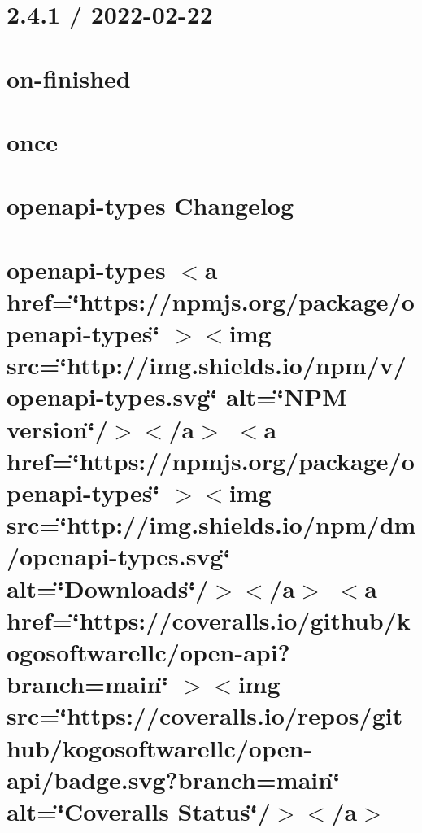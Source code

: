 \documentclass[twoside]{book}
\newcommand{\+}{\discretionary{\mbox{\scriptsize$\hookleftarrow$}}{}{}}
\begin{document}
\chapter{2.4.1 / 2022-\/02-\/22}
\label{md_Backend_nodejs_node_modules_on_finished_HISTORY}

\chapter{on-\/finished}
\label{md_Backend_nodejs_node_modules_on_finished_README}

\chapter{once}
\label{md_Backend_nodejs_node_modules_once_README}

\chapter{openapi-\/types Changelog}
\label{md_Backend_nodejs_node_modules_openapi_types_CHANGELOG}

\chapter{openapi-\/types \texorpdfstring{$<$}{<}a href=\char`\"{}https\+://npmjs.\+org/package/openapi-\/types\char`\"{} \texorpdfstring{$>$}{>}\texorpdfstring{$<$}{<}img src=\char`\"{}http\+://img.\+shields.\+io/npm/v/openapi-\/types.\+svg\char`\"{} alt=\char`\"{}\+NPM version\char`\"{}/\texorpdfstring{$>$}{>}\texorpdfstring{$<$}{<}/a\texorpdfstring{$>$}{>} \texorpdfstring{$<$}{<}a href=\char`\"{}https\+://npmjs.\+org/package/openapi-\/types\char`\"{} \texorpdfstring{$>$}{>}\texorpdfstring{$<$}{<}img src=\char`\"{}http\+://img.\+shields.\+io/npm/dm/openapi-\/types.\+svg\char`\"{} alt=\char`\"{}\+Downloads\char`\"{}/\texorpdfstring{$>$}{>}\texorpdfstring{$<$}{<}/a\texorpdfstring{$>$}{>} \texorpdfstring{$<$}{<}a href=\char`\"{}https\+://coveralls.\+io/github/kogosoftwarellc/open-\/api?branch=main\char`\"{} \texorpdfstring{$>$}{>}\texorpdfstring{$<$}{<}img src=\char`\"{}https\+://coveralls.\+io/repos/github/kogosoftwarellc/open-\/api/badge.\+svg?branch=main\char`\"{} alt=\char`\"{}\+Coveralls Status\char`\"{}/\texorpdfstring{$>$}{>}\texorpdfstring{$<$}{<}/a\texorpdfstring{$>$}{>}}
\label{md_Backend_nodejs_node_modules_openapi_types_README}

\end{document}

